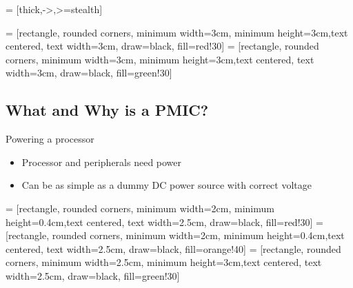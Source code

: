 \documentclass[aspectratio=169]{beamer}
\begin{document}
 = [thick,->,>=stealth]

 = [rectangle, rounded corners, minimum width=3cm, minimum height=3cm,text centered, text width=3cm, draw=black, fill=red!30]
 = [rectangle, rounded corners, minimum width=3cm, minimum height=3cm,text centered, text width=3cm, draw=black, fill=green!30]

\addtocounter{framenumber}{-1}
\begin{frame}[plain]
\section{What and Why is a PMIC?}
\end{frame}

\begin{frame}[t]{Powering a processor}\vspace{4pt}

\begin{itemize}
	\item Processor and peripherals need power
	\item Can be as simple as a dummy DC power source with correct voltage
\end{itemize}


\vfill
\centering
\begin{minipage}[c]{.75\textwidth}

\end{minipage}
\end{frame}


 = [rectangle, rounded corners, minimum width=2cm, minimum height=0.4cm,text centered, text width=2.5cm, draw=black, fill=red!30]
 = [rectangle, rounded corners, minimum width=2cm, minimum height=0.4cm,text centered, text width=2.5cm, draw=black, fill=orange!40]
 = [rectangle, rounded corners, minimum width=2.5cm, minimum height=3cm,text centered, text width=2.5cm, draw=black, fill=green!30]
\end{document}
